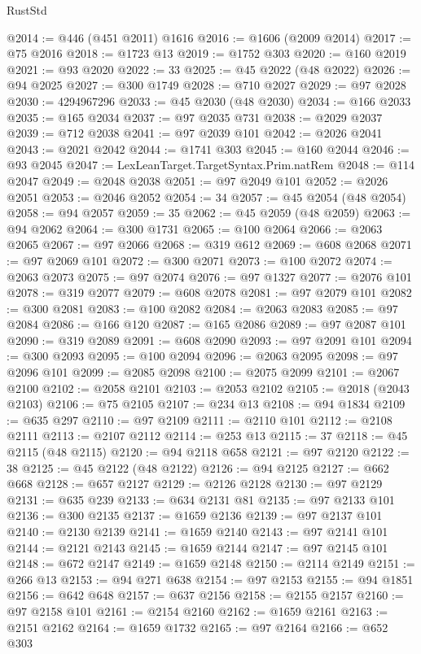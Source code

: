 \begin{lexlean}{RustStd}
\begin{coremodule}
@2014 := @446 (@451 @2011) @1616
@2016 := @1606 (@2009 @2014)
@2017 := @75 @2016
@2018 := @1723 @13
@2019 := @1752 @303
@2020 := @160 @2019
@2021 := @93 @2020
@2022 := 33
@2025 := @45 @2022 (@48 @2022)
@2026 := @94 @2025
@2027 := @300 @1749
@2028 := @710 @2027
@2029 := @97 @2028
@2030 := 4294967296
@2033 := @45 @2030 (@48 @2030)
@2034 := @166 @2033
@2035 := @165 @2034
@2037 := @97 @2035 @731
@2038 := @2029 @2037
@2039 := @712 @2038
@2041 := @97 @2039 @101
@2042 := @2026 @2041
@2043 := @2021 @2042
@2044 := @1741 @303
@2045 := @160 @2044
@2046 := @93 @2045
@2047 := LexLeanTarget.TargetSyntax.Prim.natRem
@2048 := @114 @2047
@2049 := @2048 @2038
@2051 := @97 @2049 @101
@2052 := @2026 @2051
@2053 := @2046 @2052
@2054 := 34
@2057 := @45 @2054 (@48 @2054)
@2058 := @94 @2057
@2059 := 35
@2062 := @45 @2059 (@48 @2059)
@2063 := @94 @2062
@2064 := @300 @1731
@2065 := @100 @2064
@2066 := @2063 @2065
@2067 := @97 @2066
@2068 := @319 @612
@2069 := @608 @2068
@2071 := @97 @2069 @101
@2072 := @300 @2071
@2073 := @100 @2072
@2074 := @2063 @2073
@2075 := @97 @2074
@2076 := @97 @1327
@2077 := @2076 @101
@2078 := @319 @2077
@2079 := @608 @2078
@2081 := @97 @2079 @101
@2082 := @300 @2081
@2083 := @100 @2082
@2084 := @2063 @2083
@2085 := @97 @2084
@2086 := @166 @120
@2087 := @165 @2086
@2089 := @97 @2087 @101
@2090 := @319 @2089
@2091 := @608 @2090
@2093 := @97 @2091 @101
@2094 := @300 @2093
@2095 := @100 @2094
@2096 := @2063 @2095
@2098 := @97 @2096 @101
@2099 := @2085 @2098
@2100 := @2075 @2099
@2101 := @2067 @2100
@2102 := @2058 @2101
@2103 := @2053 @2102
@2105 := @2018 (@2043 @2103)
@2106 := @75 @2105
@2107 := @234 @13
@2108 := @94 @1834
@2109 := @635 @297
@2110 := @97 @2109
@2111 := @2110 @101
@2112 := @2108 @2111
@2113 := @2107 @2112
@2114 := @253 @13
@2115 := 37
@2118 := @45 @2115 (@48 @2115)
@2120 := @94 @2118 @658
@2121 := @97 @2120
@2122 := 38
@2125 := @45 @2122 (@48 @2122)
@2126 := @94 @2125
@2127 := @662 @668
@2128 := @657 @2127
@2129 := @2126 @2128
@2130 := @97 @2129
@2131 := @635 @239
@2133 := @634 @2131 @81
@2135 := @97 @2133 @101
@2136 := @300 @2135
@2137 := @1659 @2136
@2139 := @97 @2137 @101
@2140 := @2130 @2139
@2141 := @1659 @2140
@2143 := @97 @2141 @101
@2144 := @2121 @2143
@2145 := @1659 @2144
@2147 := @97 @2145 @101
@2148 := @672 @2147
@2149 := @1659 @2148
@2150 := @2114 @2149
@2151 := @266 @13
@2153 := @94 @271 @638
@2154 := @97 @2153
@2155 := @94 @1851
@2156 := @642 @648
@2157 := @637 @2156
@2158 := @2155 @2157
@2160 := @97 @2158 @101
@2161 := @2154 @2160
@2162 := @1659 @2161
@2163 := @2151 @2162
@2164 := @1659 @1732
@2165 := @97 @2164
@2166 := @652 @303

\end{coremodule}
\end{lexlean}
